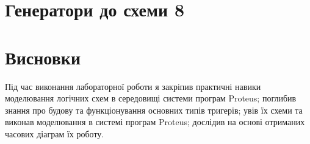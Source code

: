 \documentclass{article}
\begin{document}
\begin{normalsize}
	\section*{Генератори до схеми 8}
	\begin{figure}[H]
		\centering
		\hspace{5px}
	\end{figure}

	\section*{Висновки}
	Під час виконання лабораторної роботи я закріпив практичні навики моделювання логічних схем в середовищі системи програм Proteus; поглибив знання про будову та функціонування основних типів тригерів; увів їх схеми та виконав моделювання в системі програм Proteus; дослідив на основі отриманих часових діаграм їх роботу.
	    
\end{normalsize}
\end{document}

